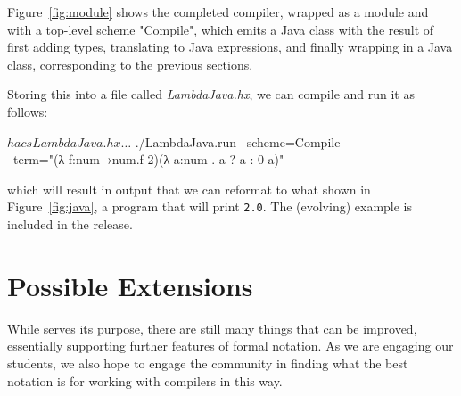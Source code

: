 \documentclass[letterpaper]{article}
\begin{document}
\begin{example}
  Figure~\ref{fig:module} shows the completed compiler, wrapped as a module and with a top-level
  scheme "Compile", which emits a Java class with the result of first adding types, translating to
  Java expressions, and finally wrapping in a Java class, corresponding to the previous sections.

  Storing this into a \HAX file called \emph{LambdaJava.hx}, we can compile and run it as follows:
  \begin{code}
    $ hacs LambdaJava.hx
    …
    $ ./LambdaJava.run --scheme=Compile \\
            --term="(λ f:num→num.f 2)(λ a:num . a ? a : 0-a)"
  \end{code}
  which will result in output that we can reformat to what shown in Figure~\ref{fig:java}, a program
  that will print \texttt{2.0}. The (evolving) example is included in the \HAX release.
\end{example}


\section{Possible Extensions}
\label{sec:further}

While \HAX serves its purpose, there are still many things that can be improved, essentially
supporting further features of formal notation. As we are engaging our students, we also hope to
engage the community in finding what the best notation is for working with compilers in this way.
\end{document}
